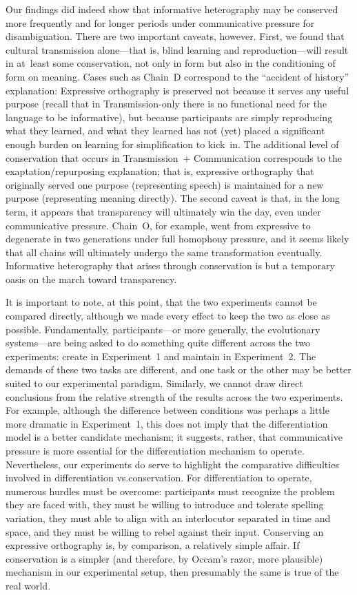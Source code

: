 \documentclass[doc,biblatex]{apa7}
\begin{document}
Our findings did indeed show that informative heterography may be conserved more frequently and for longer periods under communicative pressure for disambiguation. There are two important caveats, however. First, we found that cultural transmission alone---that is, blind learning and reproduction---will result in at~least some conservation, not only in form but also in the conditioning of form on meaning. Cases such as Chain~D correspond to the ``accident of history'' explanation: Expressive orthography is preserved not because it serves any useful purpose (recall that in Transmission-only there is no functional need for the language to be informative), but because participants are simply reproducing what they learned, and what they learned has not (yet) placed a significant enough burden on learning for simplification to kick~in. The additional level of conservation that occurs in Transmission~+ Communication corresponds to the exaptation/repurposing explanation; that is, expressive orthography that originally served one purpose (representing speech) is maintained for a new purpose (representing meaning directly). The second caveat is that, in the long term, it appears that transparency will ultimately win the day, even under communicative pressure. Chain~O, for example, went from expressive to degenerate in two generations under full homophony pressure, and it seems likely that all chains will ultimately undergo the same transformation eventually. Informative heterography that arises through conservation is but a temporary oasis on the march toward transparency.

It is important to note, at this point, that the two experiments cannot be compared directly, although we made every effect to keep the two as close as possible. Fundamentally, participants---or more generally, the evolutionary systems---are being asked to do something quite different across the two experiments: create in Experiment~1 and maintain in Experiment~2. The demands of these two tasks are different, and one task or the other may be better suited to our experimental paradigm. Similarly, we cannot draw direct conclusions from the relative strength of the results across the two experiments. For example, although the difference between conditions was perhaps a little more dramatic in Experiment~1, this does not imply that the differentiation model is a better candidate mechanism; it suggests, rather, that communicative pressure is more essential for the differentiation mechanism to operate. Nevertheless, our experiments do serve to highlight the comparative difficulties involved in differentiation vs.\@ conservation. For differentiation to operate, numerous hurdles must be overcome: participants must recognize the problem they are faced with, they must be willing to introduce and tolerate spelling variation, they must able to align with an interlocutor separated in time and space, and they must be willing to rebel against their input. Conserving an expressive orthography is, by comparison, a relatively simple affair. If conservation is a simpler (and therefore, by Occam's razor, more plausible) mechanism in our experimental setup, then presumably the same is true of the real world.
\end{document}
